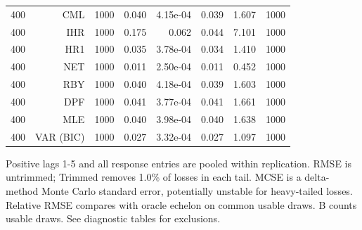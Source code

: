 \begin{table}[p]
\begin{tabular}{rrrrrrrr}
400 & CML & 1000 & 0.040 & 4.15e-04 & 0.039 & 1.607 & 1000 \\
400 & IHR & 1000 & 0.175 & 0.062 & 0.044 & 7.101 & 1000 \\
400 & HR1 & 1000 & 0.035 & 3.78e-04 & 0.034 & 1.410 & 1000 \\
400 & NET & 1000 & 0.011 & 2.50e-04 & 0.011 & 0.452 & 1000 \\
400 & RBY & 1000 & 0.040 & 4.18e-04 & 0.039 & 1.603 & 1000 \\
400 & DPF & 1000 & 0.041 & 3.77e-04 & 0.041 & 1.661 & 1000 \\
400 & MLE & 1000 & 0.040 & 3.98e-04 & 0.040 & 1.638 & 1000 \\
400 & VAR (BIC) & 1000 & 0.027 & 3.32e-04 & 0.027 & 1.097 & 1000 \\
\bottomrule\end{tabular}
\par\medskip
\begin{minipage}{0.98\linewidth}\footnotesize Positive lags 1-5 and all response entries are pooled within replication. RMSE is untrimmed; Trimmed removes 1.0\% of losses in each tail. MCSE is a delta-method Monte Carlo standard error, potentially unstable for heavy-tailed losses. Relative RMSE compares with oracle echelon on common usable draws. B counts usable draws. See diagnostic tables for exclusions.\end{minipage}
\end{table}
